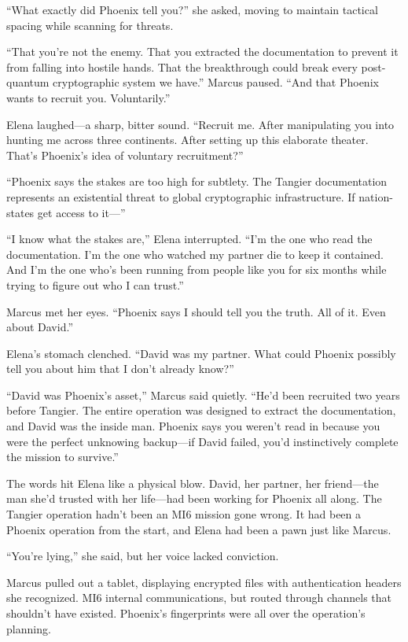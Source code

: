 ``What exactly did Phoenix tell you?'' she asked, moving to maintain tactical spacing while scanning for threats.

``That you're not the enemy. That you extracted the documentation to prevent it from falling into hostile hands. That the breakthrough could break every post-quantum cryptographic system we have.'' Marcus paused. ``And that Phoenix wants to recruit you. Voluntarily.''

Elena laughed---a sharp, bitter sound. ``Recruit me. After manipulating you into hunting me across three continents. After setting up this elaborate theater. That's Phoenix's idea of voluntary recruitment?''

``Phoenix says the stakes are too high for subtlety. The Tangier documentation represents an existential threat to global cryptographic infrastructure. If nation-states get access to it---''

``I know what the stakes are,'' Elena interrupted. ``I'm the one who read the documentation. I'm the one who watched my partner die to keep it contained. And I'm the one who's been running from people like you for six months while trying to figure out who I can trust.''

Marcus met her eyes. ``Phoenix says I should tell you the truth. All of it. Even about David.''

Elena's stomach clenched. ``David was my partner. What could Phoenix possibly tell you about him that I don't already know?''

``David was Phoenix's asset,'' Marcus said quietly. ``He'd been recruited two years before Tangier. The entire operation was designed to extract the documentation, and David was the inside man. Phoenix says you weren't read in because you were the perfect unknowing backup---if David failed, you'd instinctively complete the mission to survive.''

The words hit Elena like a physical blow. David, her partner, her friend---the man she'd trusted with her life---had been working for Phoenix all along. The Tangier operation hadn't been an MI6 mission gone wrong. It had been a Phoenix operation from the start, and Elena had been a pawn just like Marcus.

``You're lying,'' she said, but her voice lacked conviction.

Marcus pulled out a tablet, displaying encrypted files with authentication headers she recognized. MI6 internal communications, but routed through channels that shouldn't have existed. Phoenix's fingerprints were all over the operation's planning.

